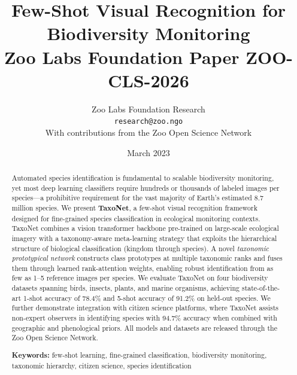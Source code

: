 \documentclass[11pt,a4paper]{article}
\title{%
  \textbf{Few-Shot Visual Recognition for\\Biodiversity Monitoring}\\[0.5em]
  \large Zoo Labs Foundation Paper ZOO-CLS-2026
}
\author{
  Zoo Labs Foundation Research\\
  \texttt{research@zoo.ngo}\\[0.5em]
  \small With contributions from the Zoo Open Science Network
}
\date{March 2023}
\begin{document}
\zoocoverpage

\begin{abstract}
\noindent
Automated species identification is fundamental to scalable biodiversity
monitoring, yet most deep learning classifiers require hundreds or
thousands of labeled images per species---a prohibitive requirement for
the vast majority of Earth's estimated 8.7 million species. We present
\textbf{TaxoNet}, a few-shot visual recognition framework designed for
fine-grained species classification in ecological monitoring contexts.
TaxoNet combines a vision transformer backbone pre-trained on large-scale
ecological imagery with a taxonomy-aware meta-learning strategy that
exploits the hierarchical structure of biological classification (kingdom
through species). A novel \emph{taxonomic prototypical network}
constructs class prototypes at multiple taxonomic ranks and fuses them
through learned rank-attention weights, enabling robust identification
from as few as 1--5 reference images per species. We evaluate TaxoNet on
four biodiversity datasets spanning birds, insects, plants, and marine
organisms, achieving state-of-the-art 1-shot accuracy of 78.4\% and
5-shot accuracy of 91.2\% on held-out species. We further demonstrate
integration with citizen science platforms, where TaxoNet assists
non-expert observers in identifying species with 94.7\% accuracy when
combined with geographic and phenological priors. All models and datasets
are released through the Zoo Open Science Network.

\medskip
\noindent\textbf{Keywords:} few-shot learning, fine-grained
classification, biodiversity monitoring, taxonomic hierarchy, citizen
science, species identification
\end{abstract}

\newpage
\tableofcontents
\newpage
















\end{document}
